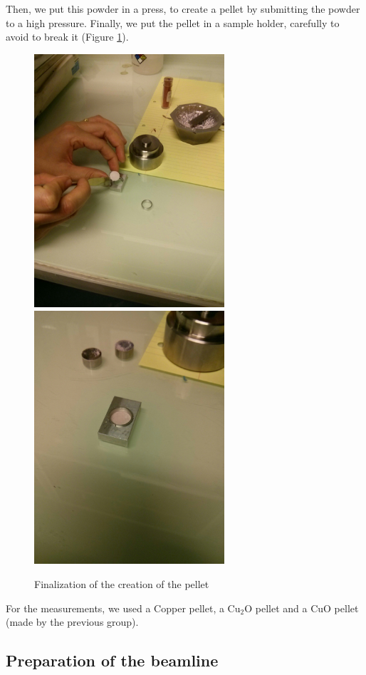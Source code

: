 \documentclass[11pt,a4paper,oneside]{report}
\begin{document}
Then, we put this powder in a press, to create a pellet by submitting the powder to a high pressure. Finally, we put the pellet in a sample holder, carefully to avoid to break it (Figure \ref{pellet}).

\begin{figure}[H]
\centering
\includegraphics[width=200pt]{Images/pellet2.jpg}
\includegraphics[width=200pt]{Images/pellet3.jpg}
\caption{Finalization of the creation of the pellet}
\label{pellet}    
\end{figure} 

For the measurements, we used a Copper pellet, a Cu$_2$O pellet and a CuO pellet (made by the previous group).

\subsection{Preparation of the beamline}
\end{document}

